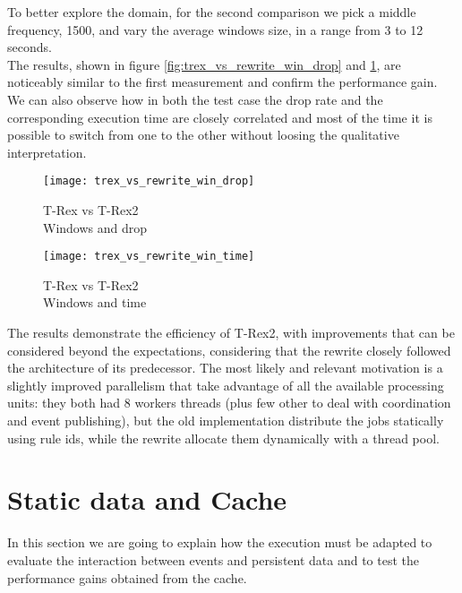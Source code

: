 To better explore the domain, for the second comparison we pick a middle frequency, 1500, and vary the average windows size, in a range from 3 to 12 seconds.\\
The results, shown in figure \ref{fig:trex_vs_rewrite_win_drop} and \ref{fig:trex_vs_rewrite_win_time}, are noticeably similar to the first measurement and confirm the performance gain.\\
We can also observe how in both the test case the drop rate and the corresponding execution time are closely correlated and most of the time it is possible to switch from one to the other without loosing the qualitative interpretation.
\begin{figure}[h]
\captionsetup{justification=centering}
\begin{minipage}{.5\textwidth}
  \centering
  \texttt{[image: trex\_vs\_rewrite\_win\_drop]}
  \caption{T-Rex vs T-Rex2\\
  	Windows and drop}
  \label{fig:trex_vs_rewrite_win_drop}
\end{minipage}%
\begin{minipage}{.5\textwidth}
  \centering
  \texttt{[image: trex\_vs\_rewrite\_win\_time]}
  \caption{T-Rex vs T-Rex2\\
  	Windows and time}
  \label{fig:trex_vs_rewrite_win_time}
\end{minipage}
\end{figure}

The results demonstrate the efficiency of T-Rex2, with improvements that can be considered beyond the expectations, considering that the rewrite closely followed the architecture of its predecessor. The most likely and relevant motivation is a slightly improved parallelism that take advantage of all the available processing units: they both had 8 workers threads (plus few other to deal with coordination and event publishing), but the old implementation distribute the jobs statically using rule ids, while the rewrite allocate them dynamically with a thread pool.\\

\section{Static data and Cache}
In this section we are going to explain how the execution must be adapted to evaluate the interaction between events and persistent data and to test the performance gains obtained from the cache.

